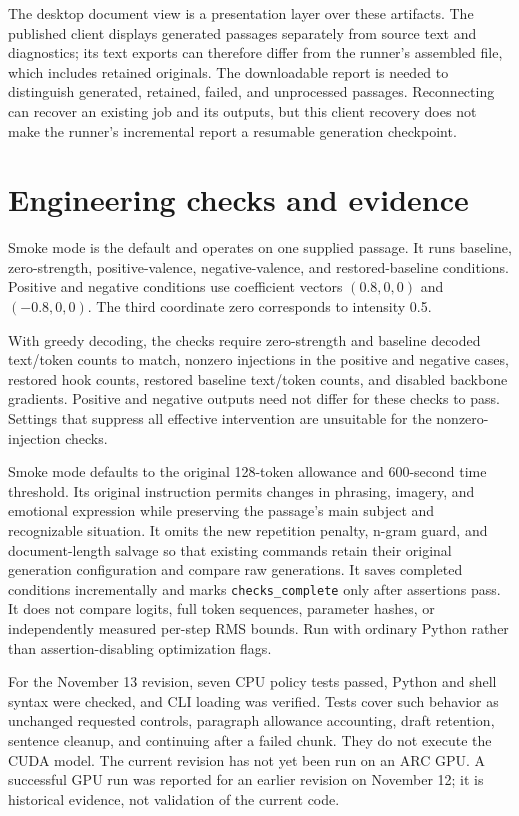 \documentclass[manuscript,screen,nonacm]{acmart}
\begin{document}
The desktop document view is a presentation layer over these artifacts. The published client displays generated passages separately from source text and diagnostics; its text exports can therefore differ from the runner's assembled file, which includes retained originals. The downloadable report is needed to distinguish generated, retained, failed, and unprocessed passages. Reconnecting can recover an existing job and its outputs, but this client recovery does not make the runner's incremental report a resumable generation checkpoint.

\section{Engineering checks and
evidence}\label{engineering-checks-and-evidence}

Smoke mode is the default and operates on one supplied passage. It runs
baseline, zero-strength, positive-valence, negative-valence, and
restored-baseline conditions. Positive and negative conditions use
coefficient vectors \((0.8,0,0)\) and \((-0.8,0,0)\). The third
coordinate zero corresponds to intensity 0.5.

With greedy decoding, the checks require zero-strength and baseline
decoded text/token counts to match, nonzero injections in the positive
and negative cases, restored hook counts, restored baseline text/token
counts, and disabled backbone gradients. Positive and negative outputs
need not differ for these checks to pass. Settings that suppress all
effective intervention are unsuitable for the nonzero-injection checks.

Smoke mode defaults to the original 128-token allowance and 600-second
time threshold. Its original instruction permits changes in phrasing,
imagery, and emotional expression while preserving the passage's main
subject and recognizable situation. It omits the new repetition penalty,
n-gram guard, and document-length salvage so that existing commands
retain their original generation configuration and compare raw
generations. It saves completed conditions incrementally and marks
\nolinkurl{checks_complete} only after assertions pass. It does not
compare logits, full token sequences, parameter hashes, or independently
measured per-step RMS bounds. Run with ordinary Python rather than
assertion-disabling optimization flags.

For the November 13 revision, seven CPU policy tests passed, Python and
shell syntax were checked, and CLI loading was verified. Tests cover
such behavior as unchanged requested controls, paragraph allowance
accounting, draft retention, sentence cleanup, and continuing after a
failed chunk. They do not execute the CUDA model. The current revision
has not yet been run on an ARC GPU. A successful GPU run was reported
for an earlier revision on November 12; it is historical evidence, not
validation of the current code.
\end{document}
